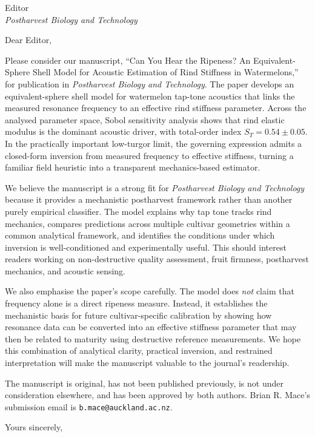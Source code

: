 \documentclass[11pt]{letter}
\date{\today}
\begin{document}
\begin{letter}{%
Editor\\
\textit{Postharvest Biology and Technology}}

\opening{Dear Editor,}
\small

Please consider our manuscript, ``Can You Hear the Ripeness? An Equivalent-Sphere Shell Model for Acoustic Estimation of Rind Stiffness in Watermelons,'' for publication in \textit{Postharvest Biology and Technology}. The paper develops an equivalent-sphere shell model for watermelon tap-tone acoustics that links the measured resonance frequency to an effective rind stiffness parameter. Across the analysed parameter space, Sobol sensitivity analysis shows that rind elastic modulus is the dominant acoustic driver, with total-order index $S_T = 0.54 \pm 0.05$. In the practically important low-turgor limit, the governing expression admits a closed-form inversion from measured frequency to effective stiffness, turning a familiar field heuristic into a transparent mechanics-based estimator.

We believe the manuscript is a strong fit for \textit{Postharvest Biology and Technology} because it provides a mechanistic postharvest framework rather than another purely empirical classifier. The model explains why tap tone tracks rind mechanics, compares predictions across multiple cultivar geometries within a common analytical framework, and identifies the conditions under which inversion is well-conditioned and experimentally useful. This should interest readers working on non-destructive quality assessment, fruit firmness, postharvest mechanics, and acoustic sensing.

We also emphasise the paper's scope carefully. The model does \emph{not} claim that frequency alone is a direct ripeness measure. Instead, it establishes the mechanistic basis for future cultivar-specific calibration by showing how resonance data can be converted into an effective stiffness parameter that may then be related to maturity using destructive reference measurements. We hope this combination of analytical clarity, practical inversion, and restrained interpretation will make the manuscript valuable to the journal's readership.

The manuscript is original, has not been published previously, is not under consideration elsewhere, and has been approved by both authors. Brian R. Mace's submission email is \texttt{b.mace@auckland.ac.nz}.

\closing{Yours sincerely,}

\end{letter}
\end{document}
